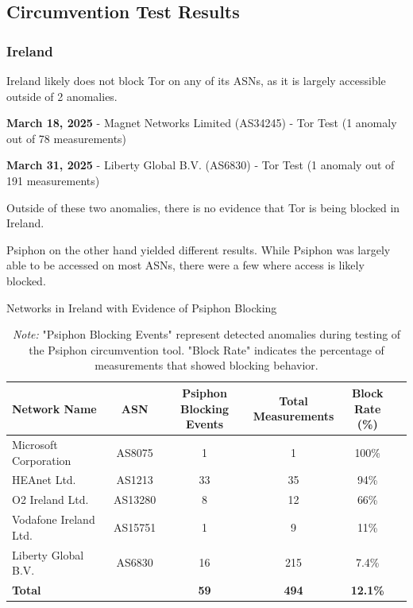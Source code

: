 \subsection{Circumvention Test Results}

\subsubsection{Ireland}

Ireland likely does not block Tor on any of its ASNs, as it is largely accessible outside of 2 anomalies.

\textbf{March 18, 2025} - Magnet Networks Limited (AS34245) - Tor Test (1 anomaly out of 78 measurements)

\textbf{March 31, 2025} - Liberty Global B.V. (AS6830) - Tor Test (1 anomaly out of 191 measurements)

Outside of these two anomalies, there is no evidence that Tor is being blocked in Ireland.

Psiphon on the other hand yielded different results. While Psiphon was largely able to be accessed on most ASNs, there were a few where access is likely blocked. 

\vspace{2em}

\begin{table}[H]
\centering
\caption{Networks in Ireland with Evidence of Psiphon Blocking}
\begin{tabular}{lccccc}
\toprule
\textbf{Network Name} & \textbf{ASN} & \shortstack{\textbf{Psiphon} \\ \textbf{Blocking Events}} & \shortstack{\textbf{Total} \\ \textbf{Measurements}} & \shortstack{\textbf{Block} \\ \textbf{Rate (\%)}} \\
\midrule
Microsoft Corporation           & AS8075  & 1  & 1   & 100\%  \\
HEAnet Ltd.                     & AS1213  & 33 & 35  & 94\%   \\
O2 Ireland Ltd.                 & AS13280 & 8  & 12  & 66\%   \\
Vodafone Ireland Ltd.           & AS15751 & 1  & 9   & 11\%   \\
Liberty Global B.V.             & AS6830  & 16 & 215 & 7.4\%  \\
\bottomrule
\textbf{Total} &  & \textbf{59} & \textbf{494} & \textbf{12.1\%} \\
\end{tabular}

\vspace{1em}

\caption*{\textit{Note:} "Psiphon Blocking Events" represent detected anomalies during testing of the Psiphon circumvention tool. "Block Rate" indicates the percentage of measurements that showed blocking behavior.}
\label{tab:psiphon_block_ireland}
\end{table}




